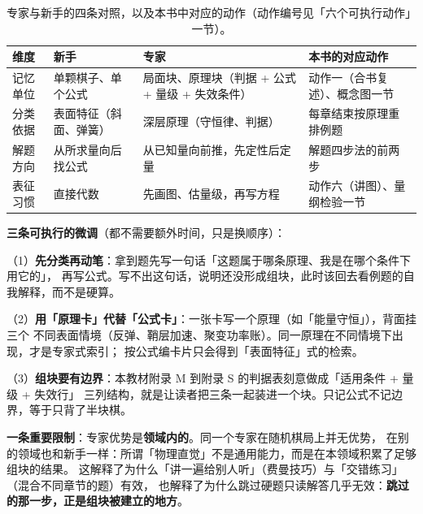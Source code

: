 \begin{table}[htbp]
  \centering
  \caption{专家与新手的四条对照，以及本书中对应的动作（动作编号见「六个可执行动作」一节）。}
  \label{tab:app-i-expert}
  \begin{tabular}{@{}p{2.0cm}p{5.6cm}p{5.6cm}p{3.4cm}@{}}
    \toprule
    维度 & 新手 & 专家 & 本书的对应动作 \\
    \midrule
    记忆单位 & 单颗棋子、单个公式 & 局面块、原理块（判据 + 公式 + 量级 + 失效条件） & 动作一（合书复述）、概念图一节 \\
    分类依据 & 表面特征（斜面、弹簧） & 深层原理（守恒律、判据） & 每章结束按原理重排例题 \\
    解题方向 & 从所求量向后找公式 & 从已知量向前推，先定性后定量 & 解题四步法的前两步 \\
    表征习惯 & 直接代数 & 先画图、估量级，再写方程 & 动作六（讲图）、量纲检验一节 \\
    \bottomrule
  \end{tabular}
\end{table}

\textbf{三条可执行的微调}（都不需要额外时间，只是换顺序）：

（1）\textbf{先分类再动笔}：拿到题先写一句话「这题属于哪条原理、我是在哪个条件下用它的」，
再写公式。写不出这句话，说明还没形成组块，此时该回去看例题的自我解释，而不是硬算。

（2）\textbf{用「原理卡」代替「公式卡」}：一张卡写一个原理（如「能量守恒」），背面挂三个
不同表面情境（反弹、鞘层加速、聚变功率账）。同一原理在不同情境下出现，才是专家式索引；
按公式编卡片只会得到「表面特征」式的检索。

（3）\textbf{组块要有边界}：本教材附录 M 到附录 S 的判据表刻意做成「适用条件 + 量级 + 失效行」
三列结构，就是让读者把三条一起装进一个块。只记公式不记边界，等于只背了半块棋。

\textbf{一条重要限制}：专家优势是\textbf{领域内的}。同一个专家在随机棋局上并无优势，
在别的领域也和新手一样：所谓「物理直觉」不是通用能力，而是在本领域积累了足够组块的结果。
这解释了为什么「讲一遍给别人听」（费曼技巧）与「交错练习」（混合不同章节的题）有效，
也解释了为什么跳过硬题只读解答几乎无效：\textbf{跳过的那一步，正是组块被建立的地方}。


